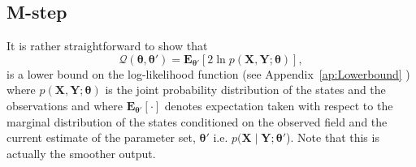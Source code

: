 \documentclass[review,authoryear,3p]{elsarticle}
\begin{document}
 \subsection{M-step}
It is rather straightforward to show that 
\begin{equation}
	\mathcal Q(\boldsymbol \theta,\boldsymbol\theta')= \mathbf E_{\boldsymbol \theta'}\left[2\ln p(\mathbf X,\mathbf Y;\boldsymbol \theta)\right], 
\end{equation}
is a lower bound on the log-likelihood function \cite{Bishop2006} (see Appendix~\ref{ap:Lowerbound} )  where $p(\mathbf X,\mathbf Y;\boldsymbol \theta)$ is the joint probability distribution of the states and the observations and where $ \mathbf E_{\boldsymbol \theta'}\left[\cdot\right] $ denotes expectation taken with respect to the marginal distribution of the states conditioned on the observed field and the current estimate of the parameter set, $\boldsymbol\theta'$ i.e.  $p(\mathbf X\mid\mathbf Y;\boldsymbol \theta'$). Note that this is actually the smoother output.
\end{document}

